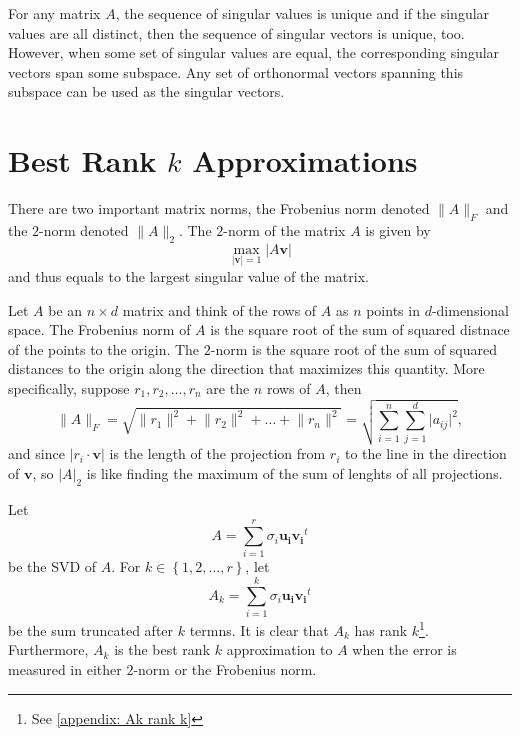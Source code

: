 \begin{note}
  For any matrix \(A\), the sequence of singular values is unique and if the singular values are all distinct, then the sequence of singular vectors is unique, too. However, when some set of singular values are equal, the corresponding singular vectors span some subspace. Any set of orthonormal vectors spanning this subspace can be used as the singular vectors. 
\end{note}

\section{Best Rank \(k\) Approximations} \label{sec: best rank k approx}

There are two important matrix norms, the Frobenius norm denoted \(\lVert A \rVert_F \) and the \(2\)-norm denoted \(\lVert A \rVert_2 \). The \(2\)-norm of the matrix \(A\) is given by 
\[
  \max _{\vert \mathbf{v}  \vert =1} \vert A \mathbf{v}  \vert 
\] 
and thus equals to the largest singular value of the matrix. 

Let \(A\) be an \(n \times d\) matrix and think of the rows of \(A\) as \(n\) points in \(d\)-dimensional space. The Frobenius norm of \(A\) is the square root of the sum of squared distnace of the points to the origin. The \(2\)-norm is the square root of the sum of squared distances to the origin along the direction that maximizes this quantity. More specifically, suppose \(r_1, r_2, \dots , r_n \) are the \(n\) rows of \(A\), then 
\[
  \lVert A \rVert_F = \sqrt{\lVert r_1 \rVert^2 + \lVert r_2 \rVert^2 + \dots + \lVert r_n \rVert^2   } = \sqrt{\sum_{i=1}^{n}\sum_{j=1}^{d} \vert a_{ij} \vert^2   },
\]   
and since \(\vert r_i \cdot \mathbf{v}  \vert \) is the length of the projection from \(r_i\) to the line in the direction of \(\mathbf{v} \), so \(\vert A \vert_2 \) is like finding the maximum of the sum of lenghts of all projections. 

Let 
\[
  A = \sum_{i=1}^{r} \sigma _i \mathbf{u_i} \mathbf{v_i}^t  
\]
be the SVD of \(A\). For \(k \in \left\{ 1,2, \dots  , r \right\} \), let 
\[
 A_k = \sum_{i=1}^{k} \sigma _i \mathbf{u_i} \mathbf{v_i}^t  
\]  
be the sum truncated after \(k\) termns. It is clear that \(A_k\) has rank \(k\)\footnote{See \autoref{appendix: Ak rank k}}. Furthermore, \(A_k\) is the best rank \(k\) approximation to \(A\) when the error is measured in either \(2\)-norm or the Frobenius norm.    



